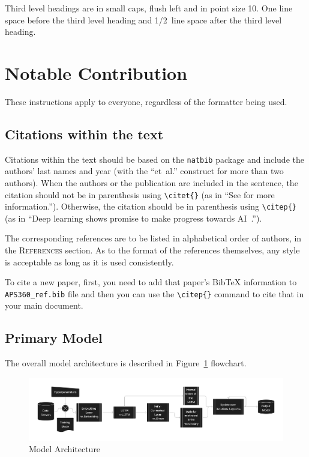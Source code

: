 \documentclass{article} %
\begin{document}
Third level headings are in small caps,
flush left and in point size 10. One line space before the third level
heading and 1/2~line space after the third level heading.

\section{Notable Contribution}
\label{others}

These instructions apply to everyone, regardless of the formatter being used.

\subsection{Citations within the text}

Citations within the text should be based on the \texttt{natbib} package
and include the authors' last names and year (with the ``et~al.'' construct
for more than two authors). When the authors or the publication are
included in the sentence, the citation should not be in parenthesis using \verb|\citet{}| (as
in ``See \citet{Hinton06} for more information.''). Otherwise, the citation
should be in parenthesis using \verb|\citep{}| (as in ``Deep learning shows promise to make progress
towards AI~\citep{Bengio+chapter2007}.'').

The corresponding references are to be listed in alphabetical order of
authors, in the \textsc{References} section. As to the format of the
references themselves, any style is acceptable as long as it is used
consistently.

To cite a new paper, first, you need to add that paper's BibTeX information to \verb+APS360_ref.bib+ file and then you can use the \verb|\citep{}| command to cite that in your main document. 

\subsection{Primary Model}

The overall model architecture is described in Figure~\ref{fig:flowchart} flowchart.

\begin{figure}[h]
  \begin{center}
  \includegraphics[width=1\textwidth]{Figs/HaikuLSTMArch.png}
  \end{center}
  \caption{Model Architecture}
  \label{fig:flowchart}
  \end{figure}
\end{document}
